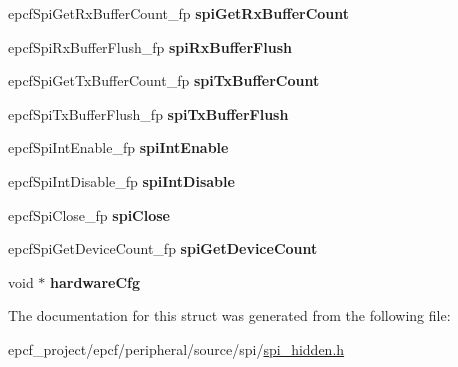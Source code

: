 \begin{DoxyCompactItemize}
\item 
\mbox{\label{structEPCFSpiController_a189050042b761c05084eab0806eb52f1}} 
epcf\+Spi\+Get\+Rx\+Buffer\+Count\+\_\+fp {\bfseries spi\+Get\+Rx\+Buffer\+Count}
\item 
\mbox{\label{structEPCFSpiController_a1630680a7b59de75901aacec41e5cde4}} 
epcf\+Spi\+Rx\+Buffer\+Flush\+\_\+fp {\bfseries spi\+Rx\+Buffer\+Flush}
\item 
\mbox{\label{structEPCFSpiController_ab4b421df3da151f9b03a35996a67570c}} 
epcf\+Spi\+Get\+Tx\+Buffer\+Count\+\_\+fp {\bfseries spi\+Tx\+Buffer\+Count}
\item 
\mbox{\label{structEPCFSpiController_a53ce753c624880161e79da9885f1cf45}} 
epcf\+Spi\+Tx\+Buffer\+Flush\+\_\+fp {\bfseries spi\+Tx\+Buffer\+Flush}
\item 
\mbox{\label{structEPCFSpiController_a26ebbfb85390e6f43a96873c6760d05b}} 
epcf\+Spi\+Int\+Enable\+\_\+fp {\bfseries spi\+Int\+Enable}
\item 
\mbox{\label{structEPCFSpiController_ac4c08af6b2a4580d4bc21a730fdff9fc}} 
epcf\+Spi\+Int\+Disable\+\_\+fp {\bfseries spi\+Int\+Disable}
\item 
\mbox{\label{structEPCFSpiController_a929d5397c50af1a7e7b4c4e5b4571e33}} 
epcf\+Spi\+Close\+\_\+fp {\bfseries spi\+Close}
\item 
\mbox{\label{structEPCFSpiController_a80d77059643bf56c1f30295ae8dc4b45}} 
epcf\+Spi\+Get\+Device\+Count\+\_\+fp {\bfseries spi\+Get\+Device\+Count}
\item 
\mbox{\label{structEPCFSpiController_ad2dc579deb85e5c5d92b18d171b8aca3}} 
void $\ast$ {\bfseries hardware\+Cfg}
\end{DoxyCompactItemize}


The documentation for this struct was generated from the following file\+:\begin{DoxyCompactItemize}
\item 
epcf\+\_\+project/epcf/peripheral/source/spi/\mbox{\hyperlink{spi__hidden_8h}{spi\+\_\+hidden.\+h}}\end{DoxyCompactItemize}
